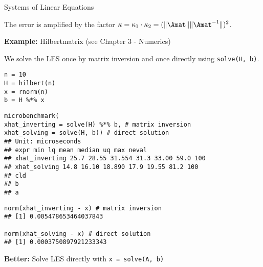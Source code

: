 \documentclass[11pt,compress,t,notes=noshow, xcolor=table]{beamer}
\begin{document}
\begin{vbframe}{Systems of Linear Equations}
\begin{itemize}
 The error is amplified by the factor $\kappa = \kappa_1 \cdot \kappa_2 = (\|\Amat\|\|\Amat^{-1}\|)^2$.
\end{itemize}

\framebreak

\textbf{Example:} Hilbertmatrix (see Chapter 3 - Numerics)

\vspace*{0.1cm}

We solve the LES once by matrix inversion and once directly using \texttt{solve(H, b)}. 
\footnotesize
\vspace{0.5cm}

\begin{verbatim}
n = 10
H = hilbert(n)
x = rnorm(n)
b = H %*% x
\end{verbatim}


\framebreak
\vspace{0.1cm}
\begin{verbatim}
microbenchmark(
xhat_inverting = solve(H) %*% b, # matrix inversion
xhat_solving = solve(H, b)) # direct solution
## Unit: microseconds
## expr min lq mean median uq max neval
## xhat_inverting 25.7 28.55 31.554 31.3 33.00 59.0 100
## xhat_solving 14.8 16.10 18.890 17.9 19.55 81.2 100
## cld
## b
## a
\end{verbatim}


\vspace{0.3cm}
\begin{verbatim}
norm(xhat_inverting - x) # matrix inversion
## [1] 0.005478653464037843

norm(xhat_solving - x) # direct solution
## [1] 0.0003750897921233343
\end{verbatim}








\framebreak
\normalsize
\textbf{Better:} Solve LES directly with \texttt{x = solve(A, b)}


\end{vbframe}
\end{document}
